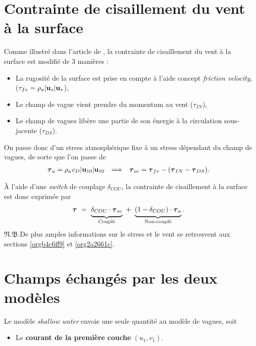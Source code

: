 \documentclass[10pt]{report}
\numberwithin{equation}{section}
\newcommand{\uu}{\vb{u}}
\newcommand{\tall}{\vphantom{pA^{x^x}_p}}
\newcommand{\pt}{\hspace{1pt}} %
\newcommand{\nb}{\underline{{\footnotesize\EightStarConvex}\pt $\mathfrak{N.B.}$\vphantom{p}}\hspace{3pt}}
\begin{document}
\section{Contrainte de cisaillement du vent à la surface}
\label{sec:org913eb5e}
\label{org9204084}

Comme illustré dans l'article de \Textcite{breivik_al_2015}, la contrainte de cisaillement du vent à la surface est modifié de 3 manières :
\begin{itemize}
\item La rugosité de la surface est prise en compte à l'aide concept \emph{friction velocity}, (\(\tau_{fv} = \rho_a |\uu_*| \uu_*\)),
\item Le champ de vague vient prendre du momentum au vent (\(\tau_{IN}\)),
\item Le champ de vagues libère une partie de son énergie à la circulation sous-jacente (\(\tau_{DS}\)).
\end{itemize}

On passe donc d'un stress atmosphérique fixe à un stress dépendant du champ de vagues, de sorte que l'on passe de 
\begin{align}
   && \boldsymbol{\tau}_a = \rho_a\pt c_D \abs{\uu_{10}}\uu_{10} && \Longrightarrow && \boldsymbol{\tau}_{oc} = \boldsymbol{\tau}_{fv} - (\boldsymbol{\tau}_{IN} - \boldsymbol{\tau}_{DS}). &&
\end{align}

À l'aide d'une \emph{switch} de couplage \(\delta_{COU}\), la contrainte de cisaillement à la surface est donc exprimée par
\begin{equation}
   \boldsymbol{\tau}\ =\ \underbrace{\tall\delta_{COU}\cdot\boldsymbol{\tau}_{oc}}_\text{Couplé}\ + \ \underbrace{(1-\delta_{COU}) \cdot \boldsymbol{\tau}_a\tall}_\text{Non-couplé}.
\end{equation}
\nb De plus amples informations sur le stress et le vent se retrouvent aux sections \ref{orgb4c6ff9} et \ref{org2a2661c}.
\section{Champs échangés par les deux modèles}
\label{sec:org29106ff}

Le modèle \emph{shallow water} envoie une seule quantité au modèle de vagues, soit
\begin{itemize}
\item Le \textbf{courant de la première couche} \((u_1,v_1)\).\bigskip
\end{itemize}
\end{document}
